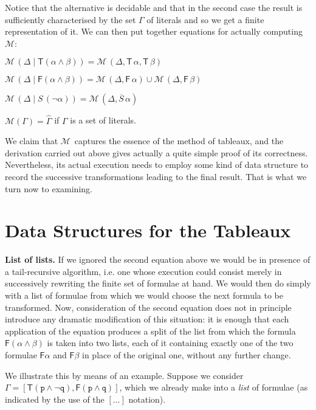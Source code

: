 \documentclass[a4paper,UKenglish]{lipics}
\newcounter{c}
\newcommand{\nentry}[1]{\noindent\textbf{#1}}
\newcommand{\lett}[1]{\texttt{#1}}
\newcommand{\sg}[1]{\textsf{#1}}
\newcommand{\op}[1]{\ensuremath{\overline{#1}}}
\newcommand{\allmodels}{\ensuremath{\mathcal{M}}}
\newcommand{\ssplit}[2]{\ensuremath{#1\!\mid\!#2}}
\newcommand{\lmods}[1]{\ensuremath{\hat{#1}}}
\begin{document}
\noindent Notice that the alternative is decidable and that in the second case the result is sufficiently characterised by the set $\Gamma$ of literals and so we get a finite representation of it.
We can then put together equations for actually computing \allmodels:



$\allmodels\,(\ssplit{\Delta}{\sg{T}(\alpha\wedge\beta)}) = \allmodels\,(\Delta, \sg{T}\,\alpha,\sg{T}\,\beta)$

$\allmodels\,(\ssplit{\Delta}{\sg{F}(\alpha\wedge\beta)})  = \allmodels\,(\Delta, \sg{F}\,\alpha) \cup \allmodels\,(\Delta, \sg{F}\,\beta)$

$\allmodels\,(\ssplit{\Delta}{S\,(\neg\alpha)})  = \allmodels\,(\Delta, \op{S}\,\alpha)$



$\allmodels(\Gamma) = \lmods{\Gamma}$ if $\Gamma$ is a set of literals.

We claim that \allmodels\ captures the essence of the method of tableaux, and the derivation carried out above gives actually a quite simple proof of its correctness. Nevertheless, its actual execution needs to employ some kind of data structure to record the successive transformations leading to the final result. That is what we turn now to examining.

\section{Data Structures for the Tableaux}
\nentry{List of lists.} If we ignored the second equation above we would be in presence of a tail-recursive algorithm,  i.e. one whose execution could consist merely in successively rewriting the finite set of formulae at hand. We would then do simply with a list of formulae from which we would choose the next formula to be transformed. Now, consideration of the second equation does not in principle introduce any dramatic modification of this situation: it is enough that each application of the equation produces a split of the list from which the formula $\sg{F}(\alpha\wedge\beta)$ is taken into two lists, each of it containing exactly one of the two formulae $\sg{F}\alpha$ and $\sg{F}\beta$ in place of the original one, without any further change.


We illustrate this  by means of an example. Suppose we consider
 $\Gamma = [\sg{T}(\lett{p}\wedge\neg\lett{q}) , \sg{F}(\lett{p}\wedge\lett{q})]$, 
\noindent which we already make into a \emph{list} of formulae (as indicated by the use of the $[\ldots]$ notation).
\end{document}
